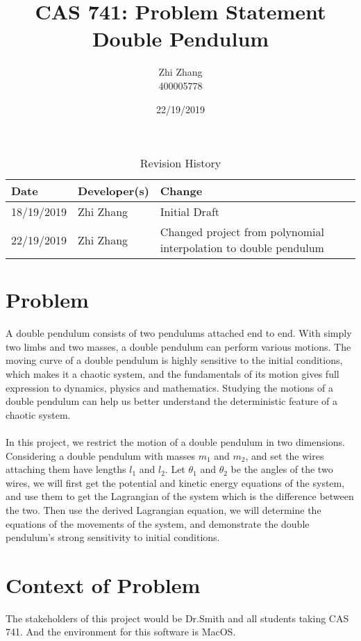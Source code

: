 \documentclass{article}
\title{CAS 741: Problem Statement\\Double Pendulum}
\author{Zhi Zhang\\400005778}
\date{22/19/2019}
\begin{document}
\maketitle
\begin{table}[hp]
\caption{Revision History} \label{TblRevisionHistory}
\begin{tabularx}{\textwidth}{llX}
\toprule
\textbf{Date} & \textbf{Developer(s)} & \textbf{Change}\\
\midrule
18/19/2019 & Zhi Zhang & Initial Draft\\
22/19/2019 & Zhi Zhang & Changed project from polynomial interpolation to double pendulum\\
\bottomrule
\end{tabularx}
\end{table}

\section{Problem}
A double pendulum consists of two pendulums attached end to end. With simply two limbs and two masses, a double pendulum can perform various motions. The moving curve of a double pendulum is highly sensitive to the initial conditions, which makes it a chaotic system, and the fundamentals of its motion gives full expression to dynamics, physics and mathematics. Studying the motions of a double pendulum can help us better understand the deterministic feature of a chaotic system.\\\\
In this project, we restrict the motion of a double pendulum in two dimensions. Considering a double pendulum with masses $\mathit{m_{1}}$ and $\mathit{m_{2}}$, and set the wires attaching them have lengths $\mathit{l_{1}}$ and $\mathit{l_{2}}$. Let $\mathit{\theta_{1}}$ and $\mathit{\theta_{2}}$ be the angles of the two wires, we will first get the potential and kinetic energy equations of the system, and use them to get the Lagrangian of the system which is the difference between the two. Then use the derived Lagrangian equation, we will determine the equations of the movements of the system, and demonstrate the double pendulum's strong sensitivity to initial conditions. 
 
\section{Context of Problem}
The stakeholders of this project would be Dr.Smith and all students taking CAS 741. And the environment for this software is MacOS.
 
\end{document}
